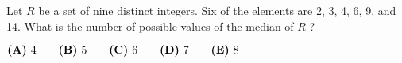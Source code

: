 

Let $R$ be a set of nine distinct integers. Six of the elements are 2, 3, 4, 6, 9, and 14. What is the number of possible values of the median of $R$ ?

$\textbf{(A)}\hspace{.05in}4 \qquad \textbf{(B)}\hspace{.05in}5 \qquad \textbf{(C)}\hspace{.05in}6 \qquad \textbf{(D)}\hspace{.05in}7 \qquad \textbf{(E)}\hspace{.05in}8 $
